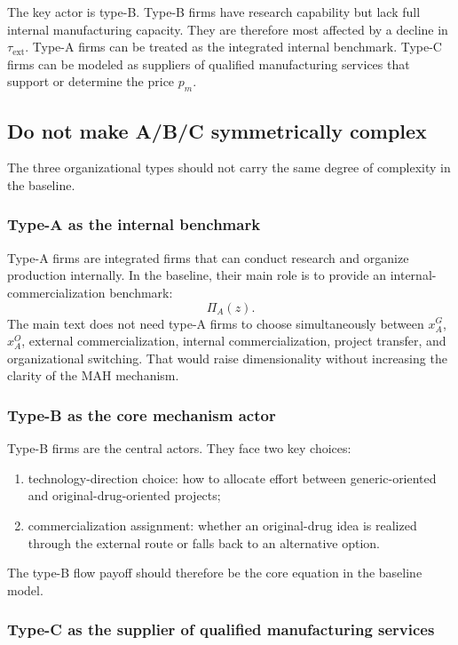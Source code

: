 \documentclass[12pt]{article}
\newcommand{\tauext}{\tau_{\mathrm{ext}}}
\begin{document}
The key actor is type-B. Type-B firms have research capability but lack full internal manufacturing capacity. They are therefore most affected by a decline in $\tauext$. Type-A firms can be treated as the integrated internal benchmark. Type-C firms can be modeled as suppliers of qualified manufacturing services that support or determine the price $p_m$.

\subsection{Do not make A/B/C symmetrically complex}

The three organizational types should not carry the same degree of complexity in the baseline.

\subsubsection{Type-A as the internal benchmark}

Type-A firms are integrated firms that can conduct research and organize production internally. In the baseline, their main role is to provide an internal-commercialization benchmark:
\[
\Pi_A(z).
\]
The main text does not need type-A firms to choose simultaneously between $x_A^G$, $x_A^O$, external commercialization, internal commercialization, project transfer, and organizational switching. That would raise dimensionality without increasing the clarity of the MAH mechanism.

\subsubsection{Type-B as the core mechanism actor}

Type-B firms are the central actors. They face two key choices:
\begin{enumerate}
    \item technology-direction choice: how to allocate effort between generic-oriented and original-drug-oriented projects;
    \item commercialization assignment: whether an original-drug idea is realized through the external route or falls back to an alternative option.
\end{enumerate}

The type-B flow payoff should therefore be the core equation in the baseline model.

\subsubsection{Type-C as the supplier of qualified manufacturing services}
\end{document}
